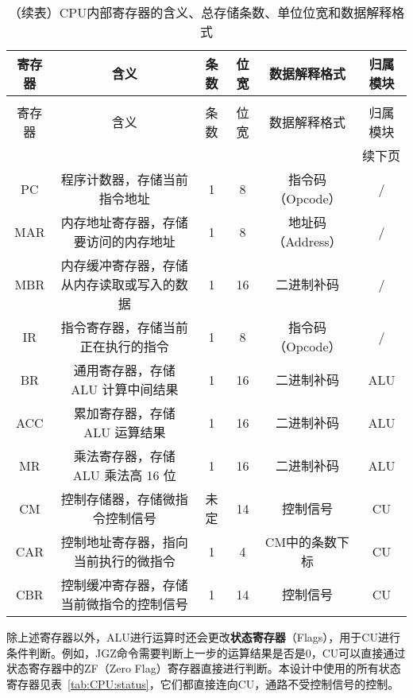 \documentclass[lang=cn,a4paper,newtx]{elegantpaper}
\begin{document}
\begin{longtable}{c c c c c c}
  \caption{CPU内部寄存器的含义、总存储条数、单位位宽和数据解释格式} \label{tab:CPU:datawidth} \\
  \toprule
  寄存器 & 含义 & 条数 & 位宽 & 数据解释格式 & 归属模块\\
  \midrule
  \endfirsthead

  \caption[]{（续表）CPU内部寄存器的含义、总存储条数、单位位宽和数据解释格式} \\
  \toprule
  寄存器 & 含义 & 条数 & 位宽 & 数据解释格式 & 归属模块\\
  \midrule
  \endhead

  \midrule
  \multicolumn{6}{r}{续下页} \\
  \midrule
  \endfoot

  \bottomrule
  \endlastfoot

  PC   & 程序计数器，存储当前指令地址             & 1  & 8   & 指令码（Opcode） & /\\
  MAR  & 内存地址寄存器，存储要访问的内存地址     & 1  & 8   & 地址码（Address）& /\\
  MBR  & 内存缓冲寄存器，存储从内存读取或写入的数据 & 1  & 16  & 二进制补码 & /\\
  IR   & 指令寄存器，存储当前正在执行的指令       & 1  & 8   & 指令码（Opcode）& /\\
  BR   & 通用寄存器，存储 ALU 计算中间结果        & 1  & 16  & 二进制补码 & ALU\\
  ACC  & 累加寄存器，存储 ALU 运算结果           & 1  & 16  & 二进制补码 & ALU\\
  MR   & 乘法寄存器，存储 ALU 乘法高 16 位       & 1  & 16  & 二进制补码 & ALU\\
  CM   & 控制存储器，存储微指令控制信号         & 未定 & 14  & 控制信号 & CU\\
  CAR  & 控制地址寄存器，指向当前执行的微指令   & 1  & 4   & CM中的条数下标 & CU\\
  CBR  & 控制缓冲寄存器，存储当前微指令的控制信号 & 1  & 14  & 控制信号 & CU\\
\end{longtable}

除上述寄存器以外，ALU进行运算时还会更改\textbf{状态寄存器}（Flags），用于CU进行条件判断。例如，JGZ命令需要判断上一步的运算结果是否是0，CU可以直接通过状态寄存器中的ZF（Zero Flag）寄存器直接进行判断。本设计中使用的所有状态寄存器见表~\ref{tab:CPU:status}，它们都直接连向CU，通路不受控制信号的控制。
\end{document}
